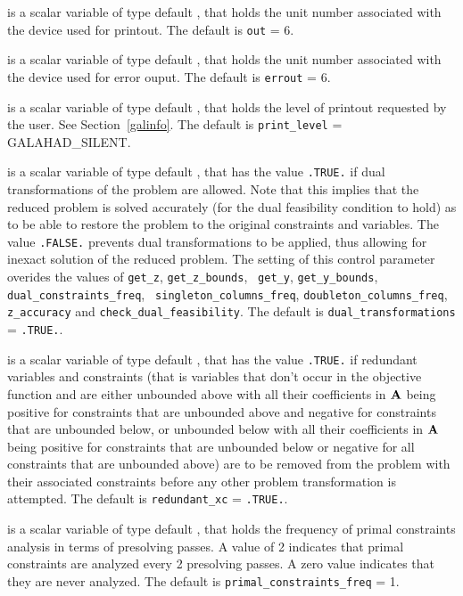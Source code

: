 \documentclass{galahad}
\newcommand{\sym}{\sf\small}
\begin{document}
\begin{description}
 is a scalar variable of type default \integer, that holds the
unit number associated with the device used for printout.
The default is {\tt out} = 6.

 is a scalar variable of type default \integer, that holds the
unit number associated with the device used for error ouput.
The default is {\tt errout} = 6.

 is a scalar variable of type default \integer, that holds the
level of printout requested by the user. See Section~\ref{galinfo}.
The default is {\tt print\_level} = {\sym GALAHAD\_SILENT}.

 is a scalar variable of type default \logical, 
that has the value {\tt .TRUE.} if dual transformations of the problem are
allowed. Note that this implies that the reduced problem is solved
accurately (for the dual feasibility condition to hold) 
as to be able to restore the problem to the original
constraints and variables. The value {\tt .FALSE.} prevents dual
transformations to be applied, thus allowing for inexact
solution of the reduced problem. The setting of this control
parameter overides the values of {\tt get\_z}, {\tt get\_z\_bounds}, {\tt
get\_y}, {\tt get\_y\_bounds}, {\tt dual\_constraints\_freq}, {\tt
singleton\_columns\_freq}, {\tt doubleton\_columns\_freq}, {\tt z\_accuracy}
and {\tt  check\_dual\_feasibility}. 
The default is {\tt dual\_transformations} = {\tt .TRUE.}.

 is a scalar variable of type default \logical, 
that has the value {\tt .TRUE.} if redundant variables and constraints
(that is variables that don't occur in the objective function and are
either unbounded above with all their coefficients in ${\mathbf{A}}$ 
being positive for constraints that are unbounded above and negative for
constraints that are unbounded below, or unbounded below
with all their coefficients in ${\mathbf{A}}$ being positive for constraints that are
unbounded below or negative for all constraints that are unbounded above)
are to be removed from the problem with their associated constraints before
any other problem transformation is attempted.
The default is {\tt redundant\_xc} = {\tt .TRUE.}.

 is a scalar variable of type default \integer,
that holds the  frequency of primal constraints analysis in terms of
presolving passes.  A value of 2 indicates that primal
constraints are analyzed every 2 presolving passes. A zero
value indicates that they are never analyzed.
The default is {\tt primal\_constraints\_freq} = 1.


\end{description}
\end{document}
